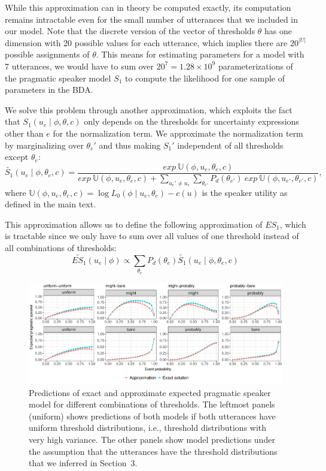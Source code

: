 While this approximation can in theory be computed exactly, its computation remains intractable even 
for the small number of utterances that we included in our model. Note that the discrete version of the
vector of thresholds $\theta$ has one dimension with 20 possible values for each utterance, which implies
there are $20^{|U|}$ possible assignments of $\theta$. This means for estimating parameters for 
a model with 7 utterances, we would have to sum over $20^{7}=1.28 \times 10^9$ 
parameterizations of the pragmatic speaker model $S_1$ to compute the likelihood for one 
sample of parameters in the BDA. 

We solve this problem through another approximation, which exploits the fact that 
$S_1(u _e \mid \phi, \theta, c)$ only depends on the thresholds for uncertainty
expressions other than $e$ for the normalization term. We approximate the normalization term by 
marginalizing over $\theta_e'$ and thus making $S_1'$ independent of all thresholds except $\theta_e$:
$$\widetilde{S_1}(u_e \mid \phi, \theta_e, c) = \frac{exp \ \mathbb{U}(\phi, u_e, \theta_e, c) } { exp \ \mathbb{U}(\phi, u_e, \theta_e, c) + 
\sum_{u_e' \ne u_e}{ \sum_{\theta_{e'}} P_d(\theta_{e'}) \  exp \ \mathbb{U}(\phi, u_{e'}, \theta_{e'}, c) } }, $$
where $\mathbb{U}(\phi, u_e, \theta_e, c) = \log L_0(\phi \mid u_e, \theta_e) - c(u) $ is the speaker utility as defined in the main text.



This approximation allows us to define the following approximation of $ES_1$, which is tractable since we only have to sum over
all values of one threshold instead of all combinations of thresholds:
$$\widetilde{ES_1}(u_e \mid \phi) \propto  \sum_{\theta_e} P_{d}(\theta_e) \widetilde{S_1}\left(u _e\mid \phi, \theta_e, c\right)$$

\begin{figure}[h!]
\includegraphics[width=\textwidth]{plots/fig-C1-approx-simulations.pdf}
\caption{Predictions of exact and approximate expected pragmatic speaker model for different combinations of thresholds. The leftmost panels (uniform) shows predictions of both models if both utterances have uniform threshold distributions, i.e., threshold distributions with very high variance. The other panels show model predictions under the assumption that the utterances have the threshold distributions that we inferred in Section~3. \label{fig:approx-simulations}}
\end{figure}

